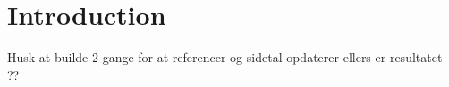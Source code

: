 \chapter{Introduction}

Husk at builde 2 gange for at referencer og sidetal opdaterer ellers er resultatet ??